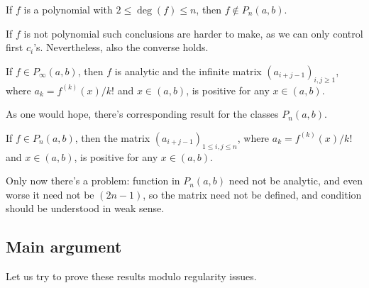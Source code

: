 \begin{prop}
	If $f$ is a polynomial with $2 \leq \deg(f) \leq n$, then $f \notin P_{n}(a, b)$.
\end{prop}

If $f$ is not polynomial such conclusions are harder to make, as we can only control first $c_{i}$'s. Nevertheless, also the converse holds.

\begin{lause}\label{heuristic_loewner}
	If $f \in P_{\infty}(a, b)$, then $f$ is analytic and the infinite matrix $(a_{i + j - 1})_{i, j \geq 1}$, where $a_{k} = f^{(k)}(x)/k!$ and $x \in (a, b)$, is positive for any $x \in (a, b)$.
\end{lause}

As one would hope, there's corresponding result for the classes $P_{n}(a, b)$.

\begin{lause}\label{heuristic_main}
	If $f \in P_{n}(a, b)$, then the matrix $(a_{i + j - 1})_{1 \leq i, j \leq n}$, where $a_{k} = f^{(k)}(x)/k!$ and $x \in (a, b)$, is positive for any $x \in (a, b)$.
\end{lause}

Only now there's a problem: function in $P_{n}(a, b)$ need not be analytic, and even worse it need not be $(2 n - 1)$, so the matrix need not be defined, and condition should be understood in weak sense.

\subsection{Main argument}

Let us try to prove these results modulo regularity issues.

